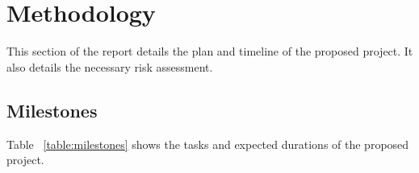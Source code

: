 
\chapter[Methodology]{Methodology}
\label{Chap:label}	%
\pagestyle{headings}



This section of the report details the plan and timeline of the proposed project. It also details the necessary risk assessment.


\section{Milestones}
\label{Sec:label}	%

Table ~\ref{table:milestones} shows the tasks and expected durations of the proposed project.
  
